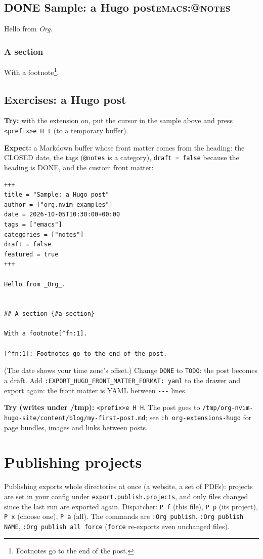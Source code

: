 \subsection{{\bfseries\sffamily DONE} Sample: a Hugo post\hfill{}\textsc{emacs:@notes}}
\label{sec:org5060a91}
Hello from \emph{Org}.
\subsubsection{A section}
\label{sec:org20a3d41}
With a footnote\footnote{Footnotes go to the end of the post.}.
\subsection{Exercises: a Hugo post}
\label{sec:orgf7b6e2d}
\textbf{Try:} with the extension on, put the cursor in the sample above and press
\texttt{<prefix>e H t} (to a temporary buffer).

\textbf{Expect:} a Markdown buffer whose front matter comes from the heading:
the CLOSED date, the tags (\texttt{@notes} is a category), \texttt{draft = false}
because the heading is DONE, and the custom front matter:

\begin{verbatim}
+++
title = "Sample: a Hugo post"
author = ["org.nvim examples"]
date = 2026-10-05T10:30:00+00:00
tags = ["emacs"]
categories = ["notes"]
draft = false
featured = true
+++

Hello from _Org_.


## A section {#a-section}

With a footnote[^fn:1].

[^fn:1]: Footnotes go to the end of the post.
\end{verbatim}

(The date shows your time zone's offset.) Change \texttt{DONE} to \texttt{TODO}: the
post becomes a draft. Add \texttt{:EXPORT\_HUGO\_FRONT\_MATTER\_FORMAT: yaml} to the
drawer and export again: the front matter is YAML between \texttt{-{}-{}-} lines.

\textbf{Try (writes under /tmp):} \texttt{<prefix>e H H}. The post goes to
\texttt{/tmp/org-nvim-hugo-site/content/blog/my-first-post.md}; see
\texttt{:h org-extensions-hugo} for page bundles, images and links between posts.
\section{Publishing projects}
\label{sec:orgbb3e03c}
Publishing exports whole directories at once (a website, a set of PDFs):
projects are set in your config under \texttt{export.publish.projects}, and only
files changed since the last run are exported again. Dispatcher: \texttt{P f}
(this file), \texttt{P p} (its project), \texttt{P x} (choose one), \texttt{P a} (all). The
commands are \texttt{:Org publish}, \texttt{:Org publish NAME}, \texttt{:Org publish all
force} (\texttt{force} re-exports even unchanged files).

